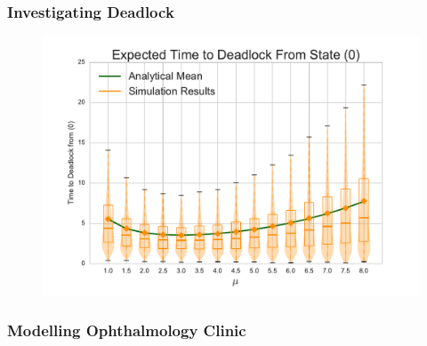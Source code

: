 \documentclass{beamer}
\begin{document}
\begin{frame}
\frametitle{Investigating Deadlock}
\begin{figure}
    
\end{figure}
\end{frame}

\begin{frame}
\begin{figure}
    \includegraphics[width=\textwidth]{varymu_1Nms}
\end{figure}
\end{frame}

\begin{frame}
\frametitle{Modelling Ophthalmology Clinic}
\begin{figure}
    
\end{figure}
\end{frame}
\end{document}
